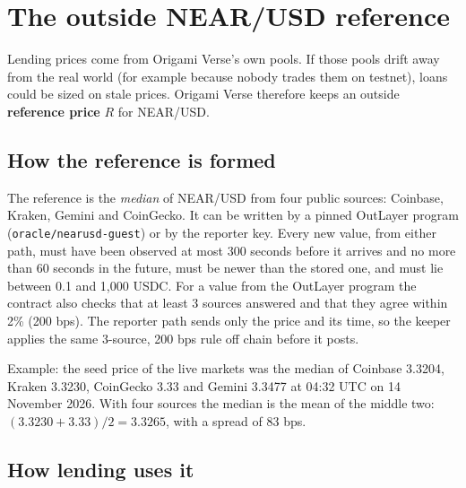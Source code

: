 \documentclass[11pt,a4paper]{article}
\newcommand{\code}[1]{\texttt{\small #1}}
\begin{document}
\section{The outside NEAR/USD reference}
\label{sec:reference}

Lending prices come from Origami Verse's own pools. If those pools drift away from the real world (for example because
nobody trades them on testnet), loans could be sized on stale prices. Origami Verse therefore keeps an outside
\textbf{reference price} $R$ for NEAR/USD.

\subsection{How the reference is formed}

The reference is the \emph{median} of NEAR/USD from four public sources: Coinbase, Kraken, Gemini and CoinGecko. It
can be written by a pinned OutLayer program (\code{oracle/nearusd-guest}) or by the reporter key. Every new value,
from either path, must have been observed at most 300 seconds before it arrives and no more than 60 seconds in the
future, must be newer than the stored one, and must lie between 0.1 and 1,000 USDC. For a value from the OutLayer
program the contract also checks that at least 3 sources answered and that they agree within 2\% (200 bps). The
reporter path sends only the price and its time, so the keeper applies the same 3-source, 200 bps rule off chain
before it posts.

Example: the seed price of the live markets was the median of Coinbase 3.3204, Kraken 3.3230, CoinGecko 3.33 and
Gemini 3.3477 at 04:32 UTC on 14 November 2026. With four sources the median is the mean of the middle two:
$(3.3230 + 3.33)/2 = 3.3265$, with a spread of 83 bps.

\subsection{How lending uses it}
\end{document}
